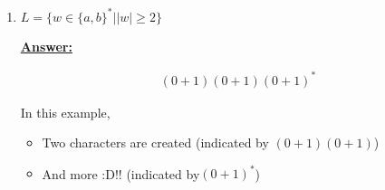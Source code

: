 \documentclass[12pt]{article}
\begin{document}
\begin{enumerate}[a.]
\begin{itemize}
\begin{enumerate}[1.]
            \item $L = \{w \in \{a,b\}^* \mid \vert w \vert \geq 2\}$

            \bigskip

            \begin{mdframed}
                \underline{\textbf{Answer:}}

                \begin{align}
                (0+1)(0+1)(0+1)^*
                \end{align}

                \bigskip

                In this example,

                \bigskip

                \begin{itemize}
                    \item Two characters are created (indicated by $(0+1)(0+1)$)
                    \item And more :D!! (indicated by$(0+1)^*$)
                \end{itemize}
            \end{mdframed}
        \end{enumerate}
    \end{itemize}
\end{enumerate}
\end{document}
